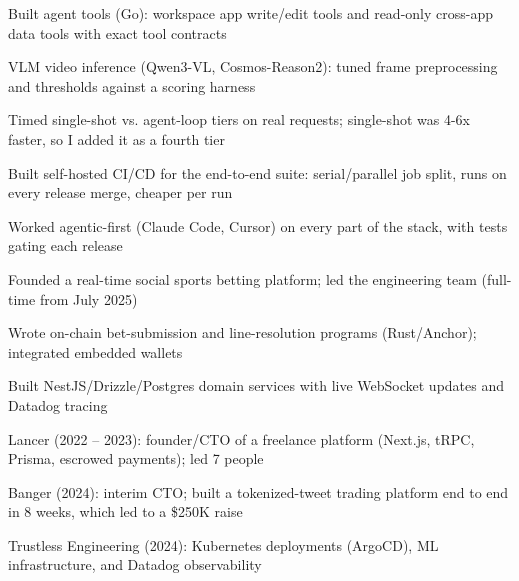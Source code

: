 \documentclass[print]{jack-resume}
\begin{document}
\begin{tightemize}
    \item Built agent tools (Go): workspace app write/edit tools and read-only cross-app data tools with exact tool contracts
    \item VLM video inference (Qwen3-VL, Cosmos-Reason2): tuned frame preprocessing and thresholds against a scoring harness
    \item Timed single-shot vs. agent-loop tiers on real requests; single-shot was 4-6x faster, so I added it as a fourth tier
    \item Built self-hosted CI/CD for the end-to-end suite: serial/parallel job split, runs on every release merge, cheaper per run
    \item Worked agentic-first (Claude Code, Cursor) on every part of the stack, with tests gating each release
\end{tightemize}
\sectionsep

\begin{tightemize}
    \item Founded a real-time social sports betting platform; led the engineering team (full-time from July 2025)
    \item Wrote on-chain bet-submission and line-resolution programs (Rust/Anchor); integrated embedded wallets
    \item Built NestJS/Drizzle/Postgres domain services with live WebSocket updates and Datadog tracing
\end{tightemize}
\sectionsep

\begin{tightemize}
    \item Lancer (2022 -- 2023): founder/CTO of a freelance platform (Next.js, tRPC, Prisma, escrowed payments); led 7 people
    \item Banger (2024): interim CTO; built a tokenized-tweet trading platform end to end in 8 weeks, which led to a \$250K raise
    \item Trustless Engineering (2024): Kubernetes deployments (ArgoCD), ML infrastructure, and Datadog observability
\end{tightemize}
\sectionsep
\end{document}

